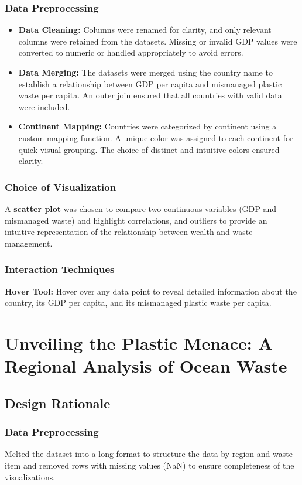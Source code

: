 \documentclass{article}
\begin{document}
\subsubsection{Data Preprocessing}
\begin{itemize}
        \item \textbf{Data Cleaning:} Columns were renamed for clarity, and only relevant columns were retained from the datasets. Missing or invalid GDP values were converted to numeric or handled appropriately to avoid errors.
        \item \textbf{Data Merging:} The datasets were merged using the country name to establish a relationship between GDP per capita\cite{GDP} and mismanaged plastic waste per capita. An outer join ensured that all countries with valid data were included.
        \item \textbf{Continent Mapping:} Countries were categorized by continent using a custom mapping function. A unique color was assigned to each continent for quick visual grouping. The choice of distinct and intuitive colors ensured clarity.
\end{itemize}

\subsubsection{Choice of Visualization}
A \textbf{scatter plot} was chosen to compare two continuous variables (GDP and mismanaged waste) and highlight correlations, and outliers to provide an intuitive representation of the relationship between wealth and waste management.

\subsubsection{Interaction Techniques}
\textbf{Hover Tool:} Hover over any data point to reveal detailed information about the country, its GDP per capita, and its mismanaged plastic waste per capita.

\section{Unveiling the Plastic Menace: A Regional Analysis of Ocean Waste}

\subsection{Design Rationale}

\subsubsection{Data Preprocessing}
Melted the dataset into a long format to structure the data by region and waste item and removed rows with missing values (NaN) to ensure completeness of the visualizations.
\end{document}
